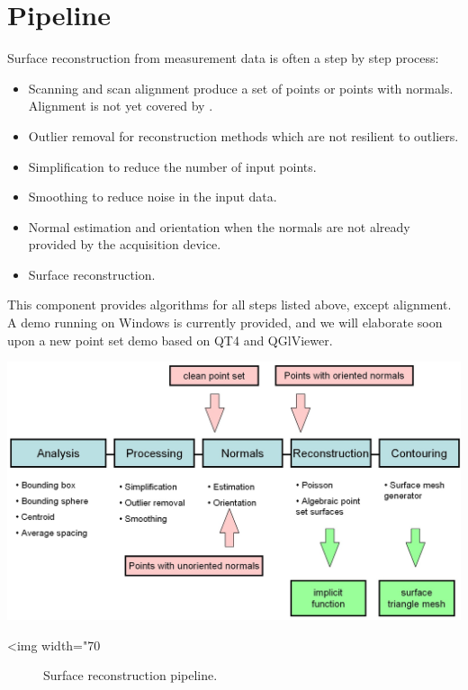 \section{Pipeline}

Surface reconstruction from measurement data is often a step by step process:

\begin{itemize}
\item Scanning and scan alignment produce a set of points
      or points with normals. Alignment is not yet
      covered by \cgal.
\item Outlier removal for reconstruction methods which
      are not resilient to outliers.
\item Simplification to reduce the number of input points.
\item Smoothing to reduce noise in the input data.
\item Normal estimation and orientation when the normals
      are not already provided by the acquisition device.
\item Surface reconstruction.
\end{itemize}

This component provides algorithms for all steps listed above, except alignment. A demo running on Windows is currently provided, and we will elaborate soon upon a new point set demo based on QT4 and QGlViewer.

\begin{center}
    \label{Surface_reconstruction_3-fig-pipeline}
    \begin{ccTexOnly}
        \includegraphics[width=1.0\textwidth]{Surface_reconstruction_3/pipeline} %
    \end{ccTexOnly}
    \begin{ccHtmlOnly}
        <img width="70%
    \end{ccHtmlOnly}
    \begin{figure}[h]
        \caption{Surface reconstruction pipeline.}
    \end{figure}
\end{center}


